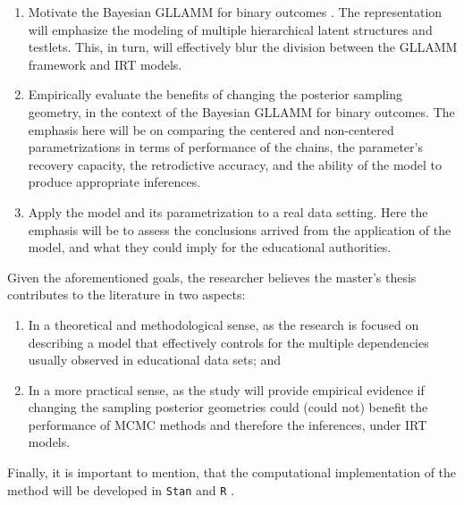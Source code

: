 \begin{enumerate}
	\item Motivate the Bayesian GLLAMM for binary outcomes \cite{Rabe_et_al_2004a, Rabe_et_al_2004b, Skrondal_et_al_2004a, Rabe_et_al_2012}. The representation will emphasize the modeling of multiple hierarchical latent structures and testlets. This, in turn, will effectively blur the division between the GLLAMM framework and IRT models.
	
	\item Empirically evaluate the benefits of changing the posterior sampling geometry, in the context of the Bayesian GLLAMM for binary outcomes. The emphasis here will be on comparing the centered and non-centered parametrizations \cite{Gelfand_et_al_1995, Gelfand_et_al_1996} in terms of performance of the chains, the parameter's recovery capacity, the retrodictive accuracy, and the ability of the model to produce appropriate inferences.
	
	\item Apply the model and its parametrization to a real data setting. Here the emphasis will be to assess the conclusions arrived from the application of the model, and what they could imply for the educational authorities.
\end{enumerate}

\noindent Given the aforementioned goals, the researcher believes the master's thesis contributes to the literature in two aspects: 

\begin{enumerate}
	\item In a theoretical and methodological sense, as the research is focused on describing a model that effectively controls for the multiple dependencies usually observed in educational data sets; and 
	
	\item In a more practical sense, as the study will provide empirical evidence if changing the sampling posterior geometries could (could not) benefit the performance of MCMC methods and therefore the inferences, under IRT models.
\end{enumerate}

\noindent Finally, it is important to mention, that the computational implementation of the method will be developed in \texttt{Stan} \cite{Stan2020} and \texttt{R} \cite{R2015, RStan2020}.


